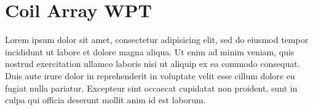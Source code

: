 \chapter{Coil Array WPT}
 Lorem ipsum dolor sit amet, consectetur adipisicing elit,
 sed do eiusmod tempor incididunt ut labore et dolore magna aliqua.
 Ut enim ad minim veniam, quis nostrud exercitation ullamco laboris nisi ut aliquip ex ea commodo consequat.
 Duis aute irure dolor in reprehenderit in voluptate velit esse cillum dolore eu fugiat nulla pariatur.
 Excepteur sint occaecat cupidatat non proident, sunt in culpa qui officia deserunt mollit anim id est laborum.